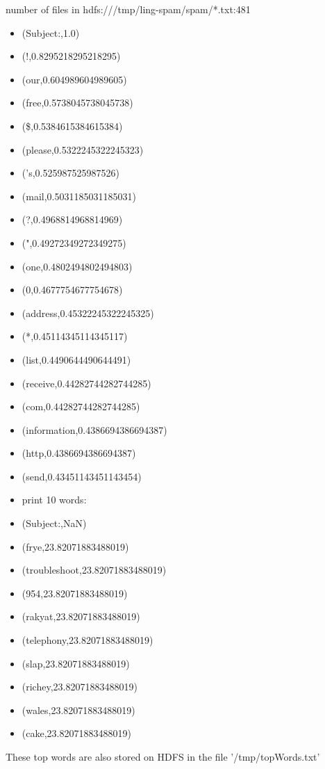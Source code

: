 \documentclass[paper=a4, fontsize=11pt]{scrartcl}
\numberwithin{equation}{section}		%
\numberwithin{figure}{section}			%
\numberwithin{table}{section}				%
\begin{document}
\begin{alphalist}
\begin{itemize}
      \end{itemize}
       number of files in hdfs:///tmp/ling-spam/spam/*.txt:481
      \begin{itemize}
	      \item (Subject:,1.0)
	      \item (!,0.8295218295218295)
	      \item (our,0.604989604989605)
	      \item (free,0.5738045738045738)
	      \item (\$,0.5384615384615384)
	      \item (please,0.5322245322245323)
	      \item ('s,0.525987525987526)
	      \item (mail,0.5031185031185031)
	      \item (?,0.4968814968814969)
	      \item (",0.49272349272349275)
	      \item (one,0.4802494802494803)
	      \item (0,0.4677754677754678)
	      \item (address,0.45322245322245325)
	      \item (*,0.45114345114345117)
	      \item (list,0.4490644490644491)
	      \item (receive,0.44282744282744285)
	      \item (com,0.44282744282744285)
	      \item (information,0.4386694386694387)
	      \item (http,0.4386694386694387)
	      \item (send,0.43451143451143454)
	      \item print 10 words:                                                                 
	      \item (Subject:,NaN)
	      \item (frye,23.82071883488019)
	      \item (troubleshoot,23.82071883488019)
	      \item (954,23.82071883488019)
	      \item (rakyat,23.82071883488019)
	      \item (telephony,23.82071883488019)
	      \item (slap,23.82071883488019)
	      \item (richey,23.82071883488019)
	      \item (wales,23.82071883488019)
	      \item (cake,23.82071883488019)

      \end{itemize}
	\item These top words are also stored on HDFS in the file
	'/tmp/topWords.txt'
\end{alphalist}
\end{document}
